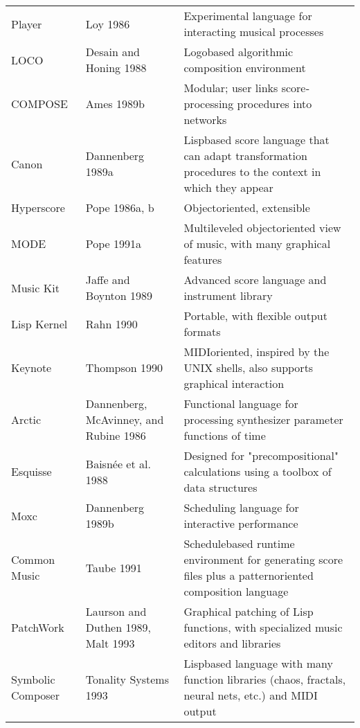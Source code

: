 \begin{table}[htbp]
\begin{tabular}{ *{3}{l} }
		Player & Loy 1986 & Experimental language for interacting musical processes \\
		LOCO & Desain and Honing 1988 & Logo­based algorithmic composition environment \\
		COMPOSE & Ames 1989b & Modular; user links score­processing procedures into networks \\
		Canon & Dannenberg 1989a & Lisp­based score language that can adapt transformation procedures to the context in which they appear \\
		Hyperscore & Pope 1986a, b & Object­oriented, extensible \\
		MODE & Pope 1991a & Multileveled object­oriented view of music, with many graphical features \\
		Music Kit & Jaffe and Boynton 1989 & Advanced score language and instrument library \\
		Lisp Kernel & Rahn 1990 & Portable, with flexible output formats \\
		Keynote & Thompson 1990 & MIDI­oriented, inspired by the UNIX shells, also supports graphical interaction \\
		Arctic & Dannenberg, McAvinney, and Rubine 1986 & Functional language for processing synthesizer parameter functions of time \\
		Esquisse & Baisnée et al. 1988 & Designed for "precompositional" calculations using a toolbox of data structures \\
		Moxc & Dannenberg 1989b & Scheduling language for interactive performance \\
		Common Music & Taube 1991 & Schedule­based runtime environment for generating score files plus a pattern­oriented composition language \\
		PatchWork & Laurson and Duthen 1989, Malt 1993 & Graphical patching of Lisp functions, with specialized music editors and libraries \\
		Symbolic Composer & Tonality Systems 1993 & Lisp­based language with many function libraries (chaos, fractals, neural nets, etc.) and MIDI output \\
		\hline
	\end{tabular}
\end{table}
